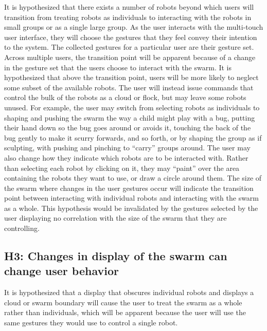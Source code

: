 It is hypothesized that there exists a number of robots beyond which users will transition from treating robots as individuals to interacting with the robots in small groups or as a single large group. 
As the user interacts with the multi-touch user interface, they will choose the gestures that they feel convey their intention to the system. 
The collected gestures for a particular user are their gesture set.
Across multiple users, the transition point will be apparent because of a change in the gesture set that the users choose to interact with the swarm. 
It is hypothesized that above the transition point, users will be more likely to neglect some subset of the available robots. 
The user will instead issue commands that control the bulk of the robots as a cloud or flock, but may leave some robots unused. 
For example, the user may switch from selecting robots as individuals to shaping and pushing the swarm the way a child might play with a bug, putting their hand down so the bug goes around or avoids it, touching the back of the bug gently to make it scurry forwards, and so forth, or by shaping the group as if sculpting, with pushing and pinching to ``carry'' groups around. 
The user may also change how they indicate which robots are to be interacted with. 
Rather than selecting each robot by clicking on it, they may ``paint'' over the area containing the robots they want to use, or draw a circle around them. 
The size of the swarm where changes in the user gestures occur will indicate the transition point between interacting with individual robots and interacting with the swarm as a whole. 
This hypothesis would be invalidated by the gestures selected by the user displaying no correlation with the size of the swarm that they are controlling. 


\subsection{H3: Changes in display of the swarm can change user behavior}

It is hypothesized that a display that obscures individual robots and displays a cloud or swarm boundary will cause the user to treat the swarm as a whole rather than individuals, which will be apparent because the user will use the same gestures they would use to control a single robot. 

